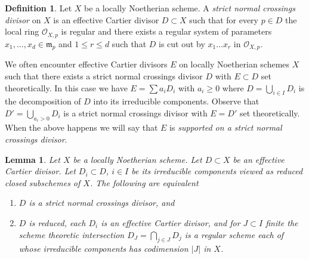 \documentclass{stacks-project}
\theoremstyle{plain}
\newtheorem{lemma}[subsection]{Lemma}
\theoremstyle{definition}
\newtheorem{definition}[subsection]{Definition}
\theoremstyle{remark}
\numberwithin{equation}{subsection}
\begin{document}
\begin{definition}
\label{definition-strict-normal-crossings}
Let $X$ be a locally Noetherian scheme. A
{\it strict normal crossings divisor}
on $X$ is an effective Cartier divisor $D \subset X$ such that
for every $p \in D$ the local ring $\mathcal{O}_{X, p}$ is regular
and there exists a regular system of parameters
$x_1, \ldots, x_d \in \mathfrak m_p$ and $1 \leq r \leq d$
such that $D$ is cut out by $x_1 \ldots x_r$ in $\mathcal{O}_{X, p}$.
\end{definition}

\noindent
We often encounter effective Cartier divisors $E$ on locally Noetherian
schemes $X$ such that there exists a strict normal crossings divisor $D$
with $E \subset D$ set theoretically.
In this case we have
$E = \sum a_i D_i$ with $a_i \geq 0$ where $D = \bigcup_{i \in I} D_i$
is the decomposition of $D$ into its irreducible components.
Observe that $D' = \bigcup_{a_i > 0} D_i$ is a strict normal crossings
divisor with $E = D'$ set theoretically.
When the above happens we will say that
$E$ is {\it supported on a strict normal crossings divisor}.

\begin{lemma}
\label{lemma-strict-normal-crossings}
Let $X$ be a locally Noetherian scheme. Let $D \subset X$ be an
effective Cartier divisor. Let $D_i \subset D$, $i \in I$ be its
irreducible components viewed as reduced closed subschemes of $X$.
The following are equivalent
\begin{enumerate}
\item $D$ is a strict normal crossings divisor, and
\item $D$ is reduced, each $D_i$ is an effective Cartier divisor, and
for $J \subset I$ finite the scheme theoretic
intersection $D_J = \bigcap_{j \in J} D_j$ is a
regular scheme each of whose irreducible components has
codimension $|J|$ in $X$.
\end{enumerate}
\end{lemma}
\end{document}
